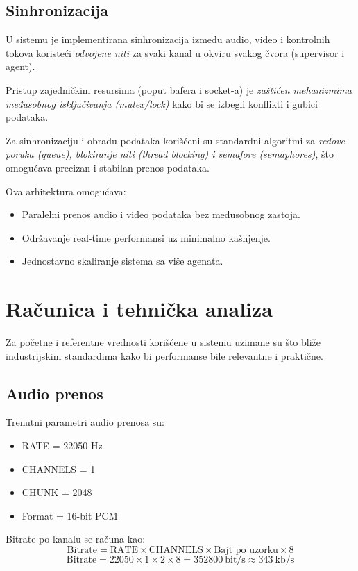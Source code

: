 \documentclass[a4paper,12pt]{article}
\begin{document}
\subsection{Sinhronizacija}

U sistemu je implementirana sinhronizacija između audio, video i kontrolnih tokova koristeći \textit{odvojene niti} za svaki kanal u okviru svakog čvora (supervisor i agent).  

Pristup zajedničkim resursima (poput bafera i socket-a) je \textit{zaštićen mehanizmima međusobnog isključivanja (mutex/lock)} kako bi se izbegli konflikti i gubici podataka.  

Za sinhronizaciju i obradu podataka korišćeni su standardni algoritmi za \textit{redove poruka (queue), blokiranje niti (thread blocking) i semafore (semaphores)}, što omogućava precizan i stabilan prenos podataka.  

Ova arhitektura omogućava:
\begin{itemize}
    \item Paralelni prenos audio i video podataka bez međusobnog zastoja.  
    \item Održavanje real-time performansi uz minimalno kašnjenje.  
    \item Jednostavno skaliranje sistema sa više agenata.
\end{itemize}

\newpage
\section{Računica i tehnička analiza}

Za početne i referentne vrednosti korišćene u sistemu uzimane su što bliže industrijskim standardima kako bi performanse bile relevantne i praktične.

\subsection{Audio prenos}

Trenutni parametri audio prenosa su:
\begin{itemize}
    \item RATE = 22050 Hz
    \item CHANNELS = 1
    \item CHUNK = 2048
    \item Format = 16-bit PCM
\end{itemize}

Bitrate po kanalu se računa kao:
\[
\text{Bitrate} = \text{RATE} \times \text{CHANNELS} \times \text{Bajt po uzorku} \times 8
\]
\[
\text{Bitrate} = 22050 \times 1 \times 2 \times 8 = 352800~\text{bit/s} \approx 343~\text{kb/s}
\]
\end{document}
